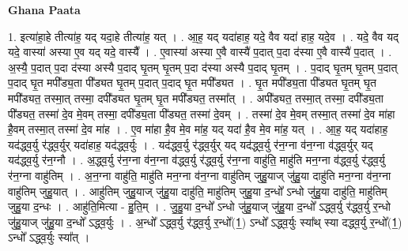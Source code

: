 \documentclass[17pt]{extarticle}
\begin{document}
\textbf{Ghana Paata } \newline

1. इत्या॑हा॒हे तीत्या॑ह॒ यद् यदा॒हे तीत्या॑ह॒ यत् । . आ॒ह॒ यद् यदा॑हाह॒ यदे॒ वैव यदा॑ हाह॒ यदे॒व । . यदे॒ वैव यद् यदे॒ वास्या॑ अस्या ए॒व यद् यदे॒ वास्यै᳚ । . ए॒वास्या॑ अस्या ए॒वै वास्यै॑ प॒दात् प॒दा द॑स्या ए॒वै वास्यै॑ प॒दात् । . अ॒स्यै॒ प॒दात् प॒दा द॑स्या अस्यै प॒दाद् घृ॒तम् घृ॒तम् प॒दा द॑स्या अस्यै प॒दाद् घृ॒तम् । . प॒दाद् घृ॒तम् घृ॒तम् प॒दात् प॒दाद् घृ॒त मपी᳚ड्य॒ता पी᳚ड्यत घृ॒तम् प॒दात् प॒दाद् घृ॒त मपी᳚ड्यत । . घृ॒त मपी᳚ड्य॒ता पी᳚ड्यत घृ॒तम् घृ॒त मपी᳚ड्यत॒ तस्मा॒त् तस्मा॒ दपी᳚ड्यत घृ॒तम् घृ॒त मपी᳚ड्यत॒ तस्मा᳚त् । . अपी᳚ड्यत॒ तस्मा॒त् तस्मा॒ दपी᳚ड्य॒ता पी᳚ड्यत॒ तस्मा॑ दे॒व मे॒वम् तस्मा॒ दपी᳚ड्य॒ता पी᳚ड्यत॒ तस्मा॑ दे॒वम् । . तस्मा॑ दे॒व मे॒वम् तस्मा॒त् तस्मा॑ दे॒व मा॑हा है॒वम् तस्मा॒त् तस्मा॑ दे॒व मा॑ह । . ए॒व मा॑हा है॒व मे॒व मा॑ह॒ यद् यदा॑ है॒व मे॒व मा॑ह॒ यत् । . आ॒ह॒ यद् यदा॑हाह॒ यद॑द्ध्व॒र्यु र॑द्ध्व॒र्युर् यदा॑हाह॒ यद॑द्ध्व॒र्युः । . यद॑द्ध्व॒र्यु र॑द्ध्व॒र्युर् यद् यद॑द्ध्व॒र्यु र॑न॒ग्ना व॑न॒ग्ना व॑द्ध्व॒र्युर् यद् यद॑द्ध्व॒र्यु र॑न॒ग्नौ । . अ॒द्ध्व॒र्यु र॑न॒ग्ना व॑न॒ग्ना व॑द्ध्व॒र्यु र॑द्ध्व॒र्यु र॑न॒ग्ना वाहु॑ति॒ माहु॑ति मन॒ग्ना व॑द्ध्व॒र्यु र॑द्ध्व॒र्यु र॑न॒ग्ना वाहु॑तिम् । . अ॒न॒ग्ना वाहु॑ति॒ माहु॑ति मन॒ग्ना व॑न॒ग्ना वाहु॑तिम् जुहु॒याज् जु॑हु॒या दाहु॑ति मन॒ग्ना व॑न॒ग्ना वाहु॑तिम् जुहु॒यात् । . आहु॑तिम् जुहु॒याज् जु॑हु॒या दाहु॑ति॒ माहु॑तिम् जुहु॒या द॒न्धो᳚ ऽन्धो जु॑हु॒या दाहु॑ति॒ माहु॑तिम् जुहु॒या द॒न्धः । . आहु॑ति॒मित्या - हु॒ति॒म् । . जु॒हु॒या द॒न्धो᳚ ऽन्धो जु॑हु॒याज् जु॑हु॒या द॒न्धो᳚ ऽद्ध्व॒र्यु र॑द्ध्व॒र्यु र॒न्धो जु॑हु॒याज् जु॑हु॒या द॒न्धो᳚ ऽद्ध्व॒र्युः । . अ॒न्धो᳚ ऽद्ध्व॒र्यु र॑द्ध्व॒र्यु र॒न्धो᳚(1॒) ऽन्धो᳚ ऽद्ध्व॒र्युः स्या᳚थ् स्या दद्ध्व॒र्यु र॒न्धो᳚(1॒) ऽन्धो᳚ ऽद्ध्व॒र्युः स्या᳚त् । \newline
\end{document}
